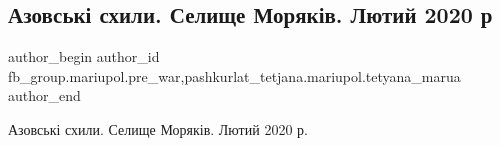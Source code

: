  
 
 
 
 

\subsection{Азовські схили. Селище Моряків. Лютий 2020 р}
\label{sec:09_02_2023.fb.fb_group.mariupol.pre_war.9.azovsk__skhili__seli}
 
\ifcmt
 author_begin
   author_id fb_group.mariupol.pre_war,pashkurlat_tetjana.mariupol.tetyana_marua
 author_end
\fi

Азовські схили. Селище Моряків. Лютий 2020 р.
